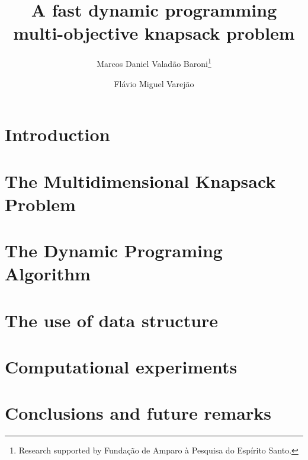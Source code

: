 \documentclass{article}
\begin{document}
\title{A fast dynamic programming multi-objective knapsack problem}

\author{
   Marcos Daniel Valad\~ao Baroni\thanks{Research supported by Funda\c c\~ao de Amparo \`a Pesquisa do Esp\'irito Santo.}
   \and
   Fl\'avio Miguel Varej\~ao
}





\maketitle

\begin{abstract}

\end{abstract}

\section{Introduction}
\label{sec:intro}


\section{The Multidimensional Knapsack Problem}
\label{sec:mokp}


\section{The Dynamic Programing Algorithm}
\label{sec:mokp}


\section{The use of data structure}
\label{sec:kdtree}


\section{Computational experiments}
\label{sec:exp}


\section{Conclusions and future remarks}
\label{sec:conc}




\end{document}
